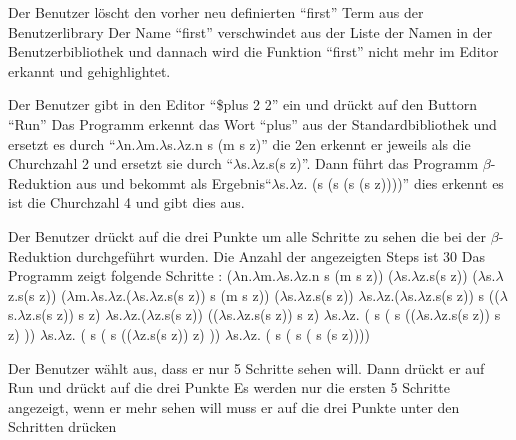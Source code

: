 \documentclass[parskip=full,11pt,twoside]{scrartcl}
\begin{document}
{Der Benutzer löscht den vorher neu definierten \enquote{first} Term aus der Benutzerlibrary}
{Der Name \enquote{first} verschwindet aus der Liste der Namen in der Benutzerbibliothek und dannach wird die Funktion \enquote{first} nicht mehr im Editor erkannt und gehighlightet.}

{Der Benutzer gibt in den Editor \enquote {\$plus 2 2} ein und drückt auf den Buttorn \enquote {Run}}
{ Das Programm erkennt das Wort \enquote {plus} aus der Standardbibliothek und ersetzt es durch \enquote {$\lambda$n.$\lambda$m.$\lambda$s.$\lambda$z.n s (m s z)} die 2en erkennt er jeweils als die Churchzahl 2 und ersetzt sie durch \enquote {$\lambda$s.$\lambda$z.s(s z)}. Dann führt das Programm $\beta$-Reduktion aus und bekommt als Ergebnis\enquote {$\lambda$s.$\lambda$z. (s (s (s (s z))))} dies erkennt es ist die Churchzahl 4 und gibt dies aus. }


{ Der Benutzer drückt auf die drei Punkte um alle Schritte zu sehen die bei der $\beta$-Reduktion durchgeführt wurden. Die Anzahl der angezeigten Steps ist 30 }
{ Das Programm zeigt folgende Schritte :
	\newline ($\lambda$n.$\lambda$m.$\lambda$s.$\lambda$z.n s (m s z)) ($\lambda$s.$\lambda$z.s(s z)) ($\lambda$s.$\lambda$z.s(s z))
	\newline ($\lambda$m.$\lambda$s.$\lambda$z.($\lambda$s.$\lambda$z.s(s z)) s (m s z)) ($\lambda$s.$\lambda$z.s(s z))
	\newline $\lambda$s.$\lambda$z.($\lambda$s.$\lambda$z.s(s z)) s (($\lambda$s.$\lambda$z.s(s z)) s z)
	\newline $\lambda$s.$\lambda$z.($\lambda$z.s(s z)) (($\lambda$s.$\lambda$z.s(s z)) s z)
	\newline $\lambda$s.$\lambda$z. ( s ( s (($\lambda$s.$\lambda$z.s(s z)) s z) ))
	\newline $\lambda$s.$\lambda$z. ( s ( s (($\lambda$z.s(s z)) z) ))
	\newline $\lambda$s.$\lambda$z. ( s ( s ( s (s z))))}

{Der Benutzer wählt aus, dass er nur 5 Schritte sehen will. Dann drückt er auf Run und drückt auf die drei Punkte}
{Es werden nur die ersten 5 Schritte angezeigt, wenn er mehr sehen will muss er auf die drei Punkte unter den Schritten drücken}
\end{document}
